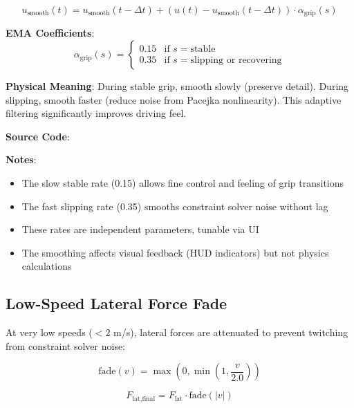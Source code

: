 \begin{equation}
  u_{\text{smooth}}(t) = u_{\text{smooth}}(t-\Delta t) + (u(t) - u_{\text{smooth}}(t-\Delta t)) \cdot \alpha_{\text{grip}}(s)
  \label{eq:grip-smoothing}
\end{equation}

\textbf{EMA Coefficients}:
\begin{equation}
  \alpha_{\text{grip}}(s) = \begin{cases}
    0.15 & \text{if } s = \text{stable} \\
    0.35 & \text{if } s = \text{slipping or recovering}
  \end{cases}
  \label{eq:grip-ema-rate}
\end{equation}

\textbf{Physical Meaning}: During stable grip, smooth slowly (preserve detail). During slipping, smooth faster (reduce noise from Pacejka nonlinearity). This adaptive filtering significantly improves driving feel.

\textbf{Source Code}: 

\textbf{Notes}:
\begin{itemize}
  \item The slow stable rate (0.15) allows fine control and feeling of grip transitions
  \item The fast slipping rate (0.35) smooths constraint solver noise without lag
  \item These rates are independent parameters, tunable via UI
  \item The smoothing affects visual feedback (HUD indicators) but not physics calculations
\end{itemize}

\subsection{Low-Speed Lateral Force Fade}

\label{sec:lateral-fade}

At very low speeds ($< 2$ m/s), lateral forces are attenuated to prevent twitching from constraint solver noise:

\begin{equation}
  \text{fade}(v) = \max\left(0, \min\left(1, \frac{v}{2.0}\right)\right)
  \label{eq:lateral-fade-function}
\end{equation}

\begin{equation}
  F_{\text{lat,final}} = F_{\text{lat}} \cdot \text{fade}(|v|)
  \label{eq:lateral-fade-applied}
\end{equation}

